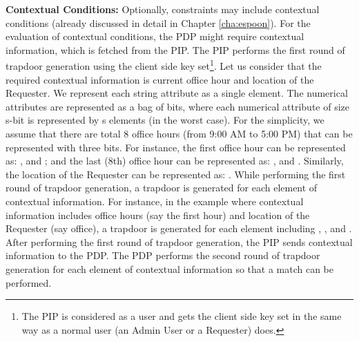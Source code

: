 \documentclass[epsfig,a4paper,11pt,titlepage]{book}
\numberwithin{algorithm}{chapter}
\begin{document}
\noindent \textbf{Contextual Conditions:} Optionally, constraints may include contextual conditions (already discussed in detail in Chapter \ref{cha:espoon}). For the evaluation of contextual conditions, the \gls{PDP} might require contextual information, which is fetched from the \gls{PIP}. The \gls{PIP} performs the first round of trapdoor generation using the client side key set\footnote{The \gls{PIP} is considered as a user and gets the client side key set in the same way as a normal user (an Admin User or a Requester) does.}. Let us consider that the required contextual information is current office hour and location of the Requester. We represent each string attribute as a single element. The numerical attributes are represented as a bag of bits, where each numerical attribute of size s-bit is represented by s elements (in the worst case). For the simplicity, we assume that there are total 8 office hours (from 9:00 AM to 5:00 PM) that can be represented with three bits. For instance, the first office hour can be represented as: ,  and ; and the last (8th) office hour can be represented as: ,  and . Similarly, the location of the Requester can be represented as: . While performing the first round of trapdoor generation, a trapdoor is generated for each element of contextual information. For instance, in the example where contextual information includes office hours (say the first hour) and location of the Requester (say office), a trapdoor is generated for each element including , ,  and . After performing the first round of trapdoor generation, the \gls{PIP} sends contextual information to the \gls{PDP}. The \gls{PDP} performs the second round of trapdoor generation for each element of contextual information so that a match can be performed.
\end{document}
